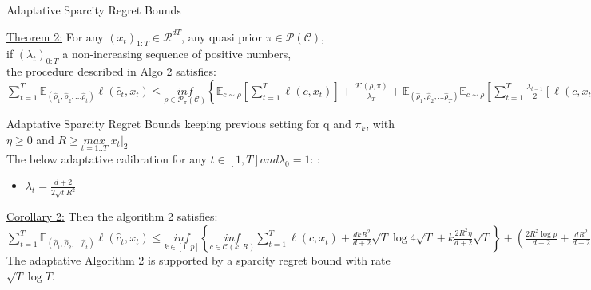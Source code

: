 \documentclass[10pt]{beamer}
\begin{document}
\begin{frame}{Adaptative Sparcity Regret Bounds}
\begin{block}{\underline{Theorem 2:}}
For any $(x_{t})_{1:T} \in \mathscr{R}^{dT}$,
any quasi prior $\pi \in \mathscr{P}(\mathscr{C})$, \\
if $(\lambda_{t})_{0:T}$ a non-increasing sequence of positive numbers,\\
\smallbreak 
the procedure described in Algo 2 satisfies:\\
\smallbreak
$
\sum_{t=1}^{T} \mathds{E}_{(\hat{\rho}_{1},\hat{\rho}_{2},...\hat{\rho}_{t})}
\ell(\hat{c}_{t}, x_{t}) \leq  \underset{\rho \in \mathscr{P}_{\pi}(\mathscr{C})}{inf}  \left\{ \mathds{E}_{c \sim \rho} [ \sum_{t=1}^{T} \ell (c, x_{t}) ] +
\frac{\mathcal{K}(\rho, \pi)}{\lambda_{T}} + 
\mathds{E}_{(\hat{\rho}_{1},\hat{\rho}_{2},...\hat{\rho}_{T})} \mathds{E}_{c \sim \rho} \left[ \sum_{t=1}^{T} \frac{\lambda_{t-1}}{2} [\ell (c, x_{t}) - \ell (\hat{c}_{t}, x_{t})]^{2} \right] \right\}
$
\end{block}
\end{frame}



\begin{frame}[fragile]{Adaptative Sparcity Regret Bounds}
keeping previous setting for q and $\pi_{k}$, with $\eta \geq 0$ and $R\geq \underset{t=1..T}{max} |x_{t}|_{2}$\\
The below adaptative calibration for any $t\in [1,T] and \lambda_{0}=1$: :\\
\begin{itemize}
\item $\lambda_{t} = \frac{d+2}{2\sqrt{t}R^{2}}$\\
\end{itemize}
\smallbreak
\begin{block}{\underline{Corollary 2:}}
Then the algorithm 2 satisfies:\\
$\sum_{t=1}^{T} \mathds{E}_{(\hat{\rho}_{1},\hat{\rho}_{2},...\hat{\rho}_{t})}             \ell (\hat{c}_{t}, x_{t}) \leq                                     \underset{k \in [1,p]}{inf} \left\{                                       \underset{c \in \mathscr{C}(k,R)}{inf} \sum_{t=1}^{T}  \ell (c, x_{t})   +\frac{dkR^{2}}{d+2}\sqrt{T}\log{4\sqrt{T}}+ k \frac{2R^{2}\eta}{d+2}\sqrt{T} \right\}
+ \left( \frac{2R^{2}\log{p}}{d+2} +\frac{dR^{2}}{d+2} +\frac{(d+2) C_{1}^{2}}{2R^{2}} \right) \sqrt{T}$
\smallbreak
The adaptative Algorithm 2 is supported by a sparcity regret bound with rate $\sqrt{T}\log{T}$.
\end{block}
\end{frame}
\end{document}
